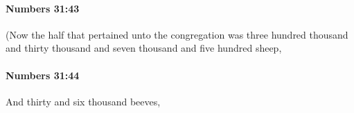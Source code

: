 		\paragraph{Numbers 31:43} %
			\label{NUMBERS-31-43}

			(Now the half that pertained unto the congregation was three hundred thousand and thirty thousand and seven thousand and five hundred sheep,


		\paragraph{Numbers 31:44} %
			\label{NUMBERS-31-44}

			And thirty and six thousand beeves,


